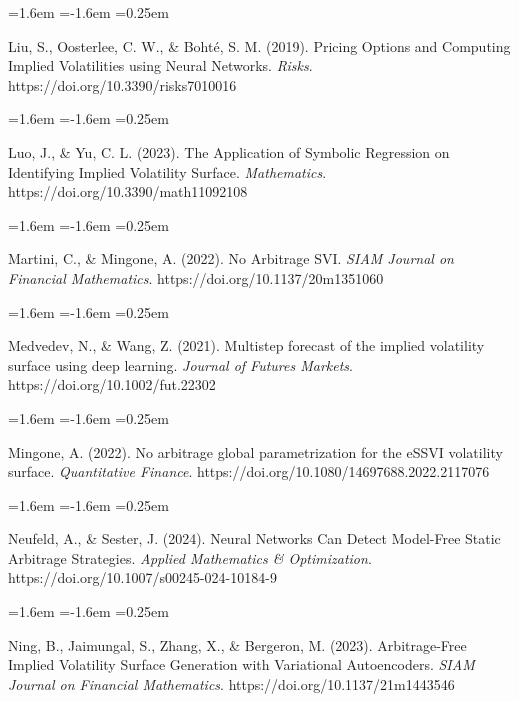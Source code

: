 \documentclass[11pt]{article}
\begin{document}
\begin{list}{}{\leftmargin=1.6em \itemindent=-1.6em \itemsep=0.25em}
\item Liu, S., Oosterlee, C. W., \& Bohté, S. M. (2019). Pricing Options and Computing Implied Volatilities using Neural Networks. \textit{Risks}. https://doi.org/10.3390/risks7010016
\end{list}
\begin{list}{}{\leftmargin=1.6em \itemindent=-1.6em \itemsep=0.25em}
\item Luo, J., \& Yu, C. L. (2023). The Application of Symbolic Regression on Identifying Implied Volatility Surface. \textit{Mathematics}. https://doi.org/10.3390/math11092108
\end{list}
\begin{list}{}{\leftmargin=1.6em \itemindent=-1.6em \itemsep=0.25em}
\item Martini, C., \& Mingone, A. (2022). No Arbitrage SVI. \textit{SIAM Journal on Financial Mathematics}. https://doi.org/10.1137/20m1351060
\end{list}
\begin{list}{}{\leftmargin=1.6em \itemindent=-1.6em \itemsep=0.25em}
\item Medvedev, N., \& Wang, Z. (2021). Multistep forecast of the implied volatility surface using deep learning. \textit{Journal of Futures Markets}. https://doi.org/10.1002/fut.22302
\end{list}
\begin{list}{}{\leftmargin=1.6em \itemindent=-1.6em \itemsep=0.25em}
\item Mingone, A. (2022). No arbitrage global parametrization for the eSSVI volatility surface. \textit{Quantitative Finance}. https://doi.org/10.1080/14697688.2022.2117076
\end{list}
\begin{list}{}{\leftmargin=1.6em \itemindent=-1.6em \itemsep=0.25em}
\item Neufeld, A., \& Sester, J. (2024). Neural Networks Can Detect Model-Free Static Arbitrage Strategies. \textit{Applied Mathematics \& Optimization}. https://doi.org/10.1007/s00245-024-10184-9
\end{list}
\begin{list}{}{\leftmargin=1.6em \itemindent=-1.6em \itemsep=0.25em}
\item Ning, B., Jaimungal, S., Zhang, X., \& Bergeron, M. (2023). Arbitrage-Free Implied Volatility Surface Generation with Variational Autoencoders. \textit{SIAM Journal on Financial Mathematics}. https://doi.org/10.1137/21m1443546
\end{list}
\end{document}
